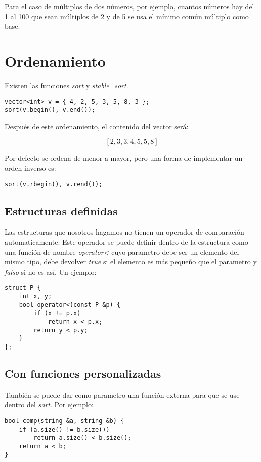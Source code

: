 \documentclass[11pt]{article}
\begin{document}
Para el caso de múltiplos de dos números, por ejemplo, cuantos números hay del 1 al 100 que sean múltiplos de 2 y de 5 se usa el mínimo común múltiplo como base.

\section{Ordenamiento}

Existen las funciones \textit{sort} y \textit{stable\_sort}.

\begin{lstlisting}
vector<int> v = { 4, 2, 5, 3, 5, 8, 3 };
sort(v.begin(), v.end());
\end{lstlisting}

Después de este ordenamiento, el contenido del vector será:

\[ [ 2, 3, 3, 4, 5, 5, 8 ] \]

Por defecto se ordena de menor a mayor, pero una forma de implementar un orden inverso es:

\begin{lstlisting}
sort(v.rbegin(), v.rend());
\end{lstlisting}

\subsection{Estructuras definidas}

Las estructuras que nosotros hagamos no tienen un operador de comparación automaticamente. Este operador se puede definir dentro de la estructura como una función de nombre \textit{operator<} cuyo parametro debe ser un elemento del mismo tipo, debe devolver \textit{true} si el elemento es más pequeño que el parametro y \textit{falso} si no es así. Un ejemplo:

\begin{lstlisting}
struct P {
    int x, y;
    bool operator<(const P &p) {
        if (x != p.x)
            return x < p.x;
        return y < p.y;
    }
};
\end{lstlisting}

\subsection{Con funciones personalizadas}

También se puede dar como parametro una función externa para que se use dentro del \textit{sort}. Por ejemplo:

\begin{lstlisting}
bool comp(string &a, string &b) {
    if (a.size() != b.size())
        return a.size() < b.size();
    return a < b;
}
\end{lstlisting}
\end{document}
